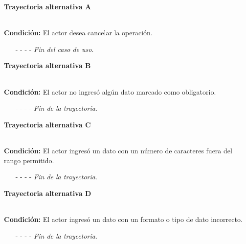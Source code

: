 \hypertarget{CU5-1:TAA}{\textbf{Trayectoria alternativa A}}\\
\noindent \textbf{Condición:} El actor desea cancelar la operación.
\begin{enumerate}
	\UCpaso[\UCactor] Solicita cancelar la operación oprimiendo el botón  de la pantalla 
	\UCpaso[\UCsist] Muestra la pantalla .
	\item[- -] - - {\em {Fin del caso de uso}}.%
\end{enumerate}
\hypertarget{CU5-1:TAB}{\textbf{Trayectoria alternativa B}}\\
\noindent \textbf{Condición:} El actor no ingresó algún dato marcado como obligatorio.
\begin{enumerate}
	\UCpaso[\UCsist] Muestra el mensaje  señalando el campo que presenta el error en la pantalla .
	\UCpaso Regresa al paso \ref{CU5.1-P3} de la trayectoria principal.
	\item[- -] - - {\em {Fin de la trayectoria}}.%
\end{enumerate}
\hypertarget{CU5-1:TAC}{\textbf{Trayectoria alternativa C}}\\
\noindent \textbf{Condición:} El actor ingresó un dato con un número de caracteres fuera del rango permitido.
\begin{enumerate}
	\UCpaso[\UCsist] Muestra el mensaje  señalando el campo que presenta el error en la pantalla .
	\UCpaso Regresa al paso \ref{CU5.1-P3} de la trayectoria principal.
	\item[- -] - - {\em {Fin de la trayectoria}}.%
\end{enumerate}
\hypertarget{CU5-1:TAD}{\textbf{Trayectoria alternativa D}}\\
\noindent \textbf{Condición:} El actor ingresó un dato con un formato o tipo de dato incorrecto.
\begin{enumerate}
	\UCpaso[\UCsist] Muestra el mensaje  señalando el campo que presenta el error en la pantalla .
	\UCpaso Regresa al paso \ref{CU5.1-P3} de la trayectoria principal.
	\item[- -] - - {\em {Fin de la trayectoria}}.
\end{enumerate}

